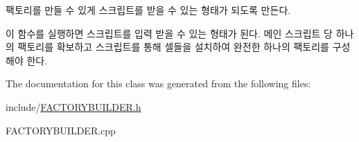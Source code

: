 팩토리를 만들 수 있게 스크립트를 받을 수 있는 형태가 되도록 만든다. 

이 함수를 실행하면 스크립트를 입력 받을 수 있는 형태가 된다. 메인 스크립트 당 하나의 팩토리를 확보하고 스크립트를 통해 셀들을 설치하여 완전한 하나의 팩토리를 구성해야 한다. 

The documentation for this class was generated from the following files\+:\begin{DoxyCompactItemize}
\item 
include/\hyperlink{FACTORYBUILDER_8h}{F\+A\+C\+T\+O\+R\+Y\+B\+U\+I\+L\+D\+E\+R.\+h}\item 
F\+A\+C\+T\+O\+R\+Y\+B\+U\+I\+L\+D\+E\+R.\+cpp\end{DoxyCompactItemize}
